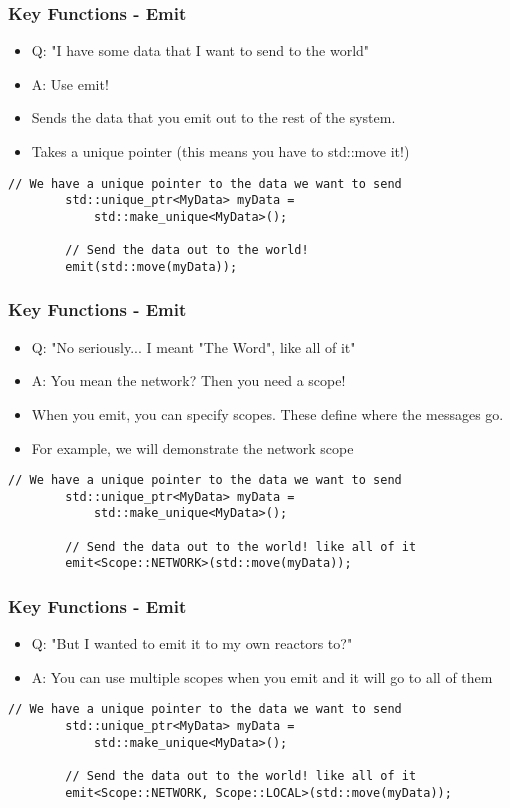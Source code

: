 \documentclass{beamer}
\begin{document}
\begin{frame}[fragile]
	\frametitle{Key Functions - Emit}
	\begin{itemize}
		\item Q: "I have some data that I want to send to the world"
		\item A: Use emit!
		\item Sends the data that you emit out to the rest of the system.
		\item Takes a unique pointer (this means you have to std::move it!)
	\end{itemize}

	\begin{lstlisting}[language=nuclear]
		// We have a unique pointer to the data we want to send
		std::unique_ptr<MyData> myData = 
		    std::make_unique<MyData>();
		
		// Send the data out to the world!
		emit(std::move(myData));
	\end{lstlisting}
\end{frame}

\begin{frame}[fragile]
	\frametitle{Key Functions - Emit}
	\begin{itemize}
		\item Q: "No seriously... I meant "The Word", like all of it"
		\item A: You mean the network? Then you need a scope!
		\item When you emit, you can specify scopes. These define where the messages go.
		\item For example, we will demonstrate the network scope
	\end{itemize}

	\begin{lstlisting}[language=nuclear]
		// We have a unique pointer to the data we want to send
		std::unique_ptr<MyData> myData = 
		    std::make_unique<MyData>();
		
		// Send the data out to the world! like all of it
		emit<Scope::NETWORK>(std::move(myData));
	\end{lstlisting}
\end{frame}

\begin{frame}[fragile]
	\frametitle{Key Functions - Emit}
	\begin{itemize}
		\item Q: "But I wanted to emit it to my own reactors to?"
		\item A: You can use multiple scopes when you emit and it will go to all of them
	\end{itemize}

	\begin{lstlisting}[language=nuclear]
		// We have a unique pointer to the data we want to send
		std::unique_ptr<MyData> myData = 
		    std::make_unique<MyData>();
		
		// Send the data out to the world! like all of it
		emit<Scope::NETWORK, Scope::LOCAL>(std::move(myData));
	\end{lstlisting}
\end{frame}
\end{document}
